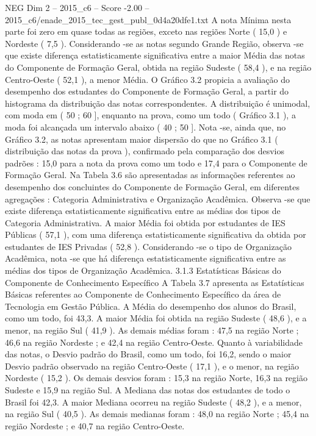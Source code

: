 \begin{textsample}{NEG Dim 2 – 2015\_c6 – Score -2.00 – 2015\_c6/enade\_2015\_tec\_gest\_publ\_0d4a20dfe1.txt}
A nota Mínima nesta parte foi zero em quase todas as regiões, exceto nas regiões Norte ( 15,0 ) e Nordeste ( 7,5 ).
Considerando -se as notas segundo Grande Região, observa -se que existe diferença estatisticamente significativa entre a maior Média das notas do Componente de Formação Geral, obtida na região Sudeste ( 58,4 ), e na região Centro-Oeste ( 52,1 ), a menor Média.
O Gráfico 3.2 propicia a avaliação do desempenho dos estudantes do Componente de Formação Geral, a partir do histograma da distribuição das notas correspondentes.
A distribuição é unimodal, com moda em ( 50 ; 60 ], enquanto na prova, como um todo ( Gráfico 3.1 ), a moda foi alcançada um intervalo abaixo ( 40 ; 50 ].
Nota -se, ainda que, no Gráfico 3.2, as notas apresentam maior dispersão do que no Gráfico 3.1 ( distribuição das notas da prova ), confirmado pela comparação dos desvios padrões : 15,0 para a nota da prova como um todo e 17,4 para o Componente de Formação Geral.
Na Tabela 3.6 são apresentadas as informações referentes ao desempenho dos concluintes do Componente de Formação Geral, em diferentes agregações : Categoria Administrativa e Organização Acadêmica.
Observa -se que existe diferença estatisticamente significativa entre as médias dos tipos de Categoria Administrativa.
A maior Média foi obtida por estudantes de IES Públicas ( 57,1 ), com uma diferença estatisticamente significativa da obtida por estudantes de IES Privadas ( 52,8 ).
Considerando -se o tipo de Organização Acadêmica, nota -se que há diferença estatisticamente significativa entre as médias dos tipos de Organização Acadêmica. 3.1.3 Estatísticas Básicas do Componente de Conhecimento Específico A Tabela 3.7 apresenta as Estatísticas Básicas referentes ao Componente de Conhecimento Específico da área de Tecnologia em Gestão Pública.
A Média do desempenho dos alunos do Brasil, como um todo, foi 43,3.
A maior Média foi obtida na região Sudeste ( 48,6 ), e a menor, na região Sul ( 41,9 ).
As demais médias foram : 47,5 na região Norte ; 46,6 na região Nordeste ; e 42,4 na região Centro-Oeste.
Quanto à variabilidade das notas, o Desvio padrão do Brasil, como um todo, foi 16,2, sendo o maior Desvio padrão observado na região Centro-Oeste ( 17,1 ), e o menor, na região Nordeste ( 15,2 ).
Os demais desvios foram : 15,3 na região Norte, 16,3 na região Sudeste e 15,9 na região Sul.
A Mediana das notas dos estudantes de todo o Brasil foi 42,3.
A maior Mediana ocorreu na região Sudeste ( 48,2 ), e a menor, na região Sul ( 40,5 ).
As demais medianas foram : 48,0 na região Norte ; 45,4 na região Nordeste ; e 40,7 na região Centro-Oeste.

\end{textsample}
